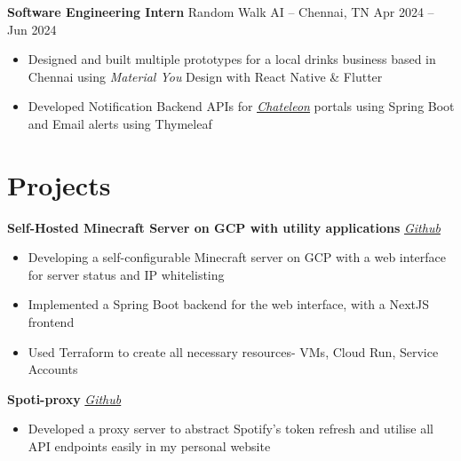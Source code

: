 \documentclass[11pt]{article}       %
\begin{document}
\textbf{Software Engineering Intern} {Random Walk AI} -- Chennai, TN \hfill Apr 2024 -- Jun 2024 \\
\vspace{-9pt}
\begin{itemize}
    \item Designed and built multiple prototypes for a local drinks business
          based in Chennai using \textit{Material You} Design with React Native \& Flutter
    \item Developed Notification Backend APIs for
        \textit{\href{https://chateleon.com}{\underline{Chateleon}}} portals using Spring Boot and
        Email alerts using Thymeleaf
\end{itemize}


\vspace{-18.5pt}

\section*{Projects}
\textbf{Self-Hosted Minecraft Server on GCP with utility applications} \hfill \href{https://github.com/apparentlyarhm/minecraft-terraform}{\textit{Github}} \\
\vspace{-9pt}
\begin{itemize}
    \item{ Developing a self-configurable Minecraft server on GCP with a web interface for server status and IP whitelisting}
    \item {Implemented a Spring Boot backend for the web interface, with a NextJS frontend}
    \item {Used Terraform to create all necessary resources- VMs, Cloud Run, Service Accounts}
\end{itemize}

\textbf{Spoti-proxy} \hfill \href{https://github.com/apparentlyarhm/spotify-proxy}{\textit{Github}} \\
\vspace{-9pt}
\begin{itemize}
    \item {Developed a proxy server to abstract Spotify's token refresh and utilise all API endpoints easily in my personal website}

\end{itemize}
\end{document}
